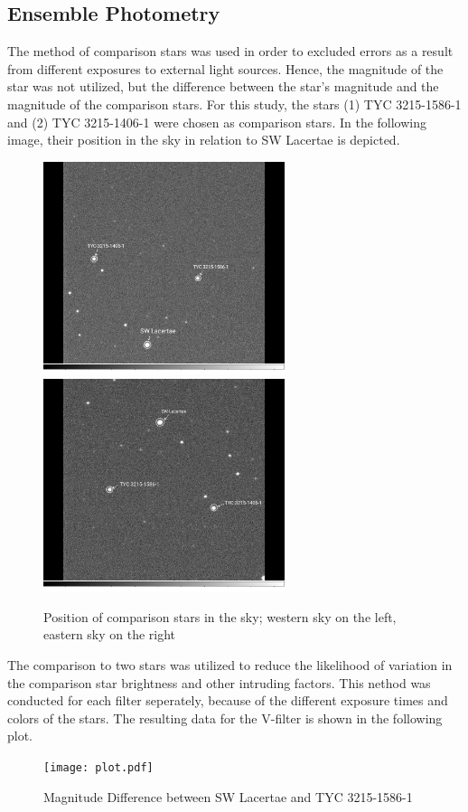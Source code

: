 \subsection{Ensemble Photometry}
  \label{sec:great}
  The method of comparison stars was used in order to excluded errors as a result 
  from different exposures to external light sources. 
  Hence, the magnitude of the star was not utilized, but the difference between the star’s 
  magnitude and the magnitude of the comparison stars. For this study, the stars 
  (1) TYC 3215-1586-1 and (2) TYC 3215-1406-1 were chosen as comparison stars. 
  In the following image, their position in the sky in relation to SW Lacertae
  is depicted.
  \begin{figure}[H]
    \centering
    \includegraphics[width=200pt]{WestHA~2.jpg}
    \hspace{1em}
    \includegraphics[width=200pt]{EastHA~2.jpg}
    \caption{Position of comparison stars in the sky; western sky on the left, eastern sky on the right}
    \label{fig:plot}
  \end{figure}
  The comparison to two stars was utilized to reduce the likelihood of 
  variation in the comparison star brightness and other intruding factors.
  This nethod was conducted for each filter seperately, because of the different 
  exposure times and colors of the stars.
  The resulting data for the V-filter is shown in the following plot.
  \begin{figure}[H]
    \centering
    \texttt{[image: plot.pdf]}
    \caption{Magnitude Difference between SW Lacertae and TYC 3215-1586-1}
    \label{fig:plot}
  \end{figure}

